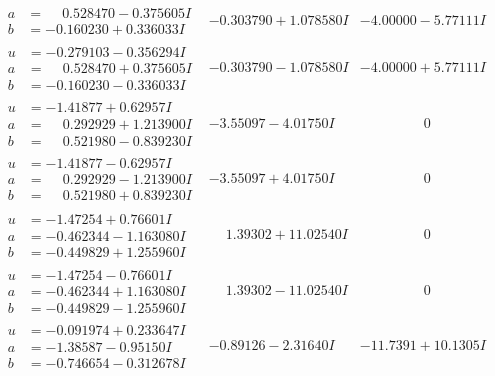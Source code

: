 \documentclass[1p]{elsarticle_modified}
\theoremstyle{definition}
\begin{document}
$$\begin{array}{c|c|c}
\begin{aligned}
a &= \phantom{-}0.528470 - 0.375605 I \\
b &= -0.160230 + 0.336033 I\end{aligned}
 & -0.303790 + 1.078580 I & -4.00000 - 5.77111 I \\ \hline\begin{aligned}
u &= -0.279103 - 0.356294 I \\
a &= \phantom{-}0.528470 + 0.375605 I \\
b &= -0.160230 - 0.336033 I\end{aligned}
 & -0.303790 - 1.078580 I & -4.00000 + 5.77111 I \\ \hline\begin{aligned}
u &= -1.41877 + 0.62957 I \\
a &= \phantom{-}0.292929 + 1.213900 I \\
b &= \phantom{-}0.521980 - 0.839230 I\end{aligned}
 & -3.55097 - 4.01750 I & \phantom{-0.000000 } 0 \\ \hline\begin{aligned}
u &= -1.41877 - 0.62957 I \\
a &= \phantom{-}0.292929 - 1.213900 I \\
b &= \phantom{-}0.521980 + 0.839230 I\end{aligned}
 & -3.55097 + 4.01750 I & \phantom{-0.000000 } 0 \\ \hline\begin{aligned}
u &= -1.47254 + 0.76601 I \\
a &= -0.462344 - 1.163080 I \\
b &= -0.449829 + 1.255960 I\end{aligned}
 & \phantom{-}1.39302 + 11.02540 I & \phantom{-0.000000 } 0 \\ \hline\begin{aligned}
u &= -1.47254 - 0.76601 I \\
a &= -0.462344 + 1.163080 I \\
b &= -0.449829 - 1.255960 I\end{aligned}
 & \phantom{-}1.39302 - 11.02540 I & \phantom{-0.000000 } 0 \\ \hline\begin{aligned}
u &= -0.091974 + 0.233647 I \\
a &= -1.38587 - 0.95150 I \\
b &= -0.746654 - 0.312678 I\end{aligned}
 & -0.89126 - 2.31640 I & -11.7391 + 10.1305 I \\ \hline\begin{aligned}

\end{aligned}
\end{array}$$
\end{document}
